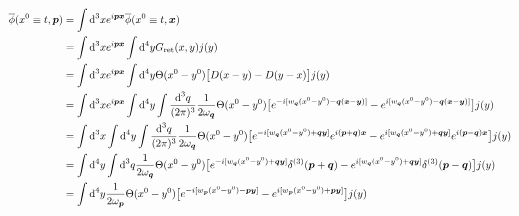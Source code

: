 \begin{subequations}
    \begin{align}
        \overline{\phi}(x^0\equiv t,\mathbf{p}) & =\int\dt^3x e^{\imagu\mathbf{p}\mathbf{x}}\overline{\phi}(x^0\equiv t,\mathbf{x})                                                                                                                                                                                                                                             \\
                                                & =\int\dt^3xe^{\imagu\mathbf{p}\mathbf{x}}\int\dt^4yG_{\text{ret}}(x,y)j(y)                                                                                                                                                                                                                                                    \\
                                                & =\int\dt^3xe^{\imagu\mathbf{p}\mathbf{x}}\int\dt^4y\Theta(x^0-y^0)\big[D(x-y)-D(y-x)\big]j(y)                                                                                                                                                                                                                                 \\
                                                & =\int\dt^3xe^{\imagu\mathbf{p}\mathbf{x}}\int\dt^4y\int\frac{\dt^3q}{(2\pi)^3}\frac{1}{2\omega_{\mathbf{q}}}\Theta(x^0-y^0)\big[e^{-\imagu[w_{\mathbf{q}}(x^0-y^0)-\mathbf{q}(\mathbf{x}-\mathbf{y})]}-e^{\imagu[w_{\mathbf{q}}(x^0-y^0)-\mathbf{q}(\mathbf{x}-\mathbf{y})]}\big]j(y)                                         \\
                                                & =\int\dt^3x\int\dt^4y\int\frac{\dt^3q}{(2\pi)^3}\frac{1}{2\omega_{\mathbf{q}}}\Theta(x^0-y^0)\big[e^{-\imagu[w_{\mathbf{q}}(x^0-y^0)+\mathbf{q}\mathbf{y}]}e^{\imagu(\mathbf{p}+\mathbf{q})\mathbf{x}}-e^{\imagu[w_{\mathbf{q}}(x^0-y^0)+\mathbf{q}\mathbf{y}]}e^{\imagu(\mathbf{p}-\mathbf{q})\mathbf{x}}\big]j(y)           \\
                                                & =\int\dt^4y\int\dt^3q\frac{1}{2\omega_{\mathbf{q}}}\Theta(x^0-y^0)\big[e^{-\imagu[w_{\mathbf{q}}(x^0-y^0)+\mathbf{q}\mathbf{y}]}\delta^{(3)}(\mathbf{p}+\mathbf{q})-e^{\imagu[w_{\mathbf{q}}(x^0-y^0)+\mathbf{q}\mathbf{y}]}\delta^{(3)}(\mathbf{p}-\mathbf{q})\big]j(y)                                                      \\
                                                & =\int\dt^4y\frac{1}{2\omega_{\mathbf{p}}}\Theta(x^0-y^0)\big[e^{-\imagu[w_{\mathbf{p}}(x^0-y^0)-\mathbf{p}\mathbf{y}]}-e^{\imagu[w_{\mathbf{p}}(x^0-y^0)+\mathbf{p}\mathbf{y}]}\big]j(y)                                                                                                                                      \\

\end{align}
\end{subequations}
